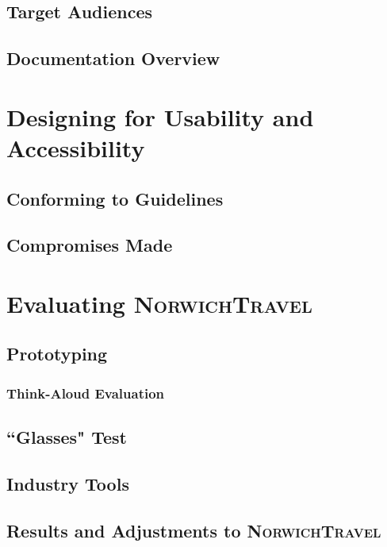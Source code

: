 \documentclass{ueacmpstyle}
\newcommand{\nt}{\textsc{NorwichTravel}}
\begin{document}
		\subsection{Target Audiences}
		
		\subsection{Documentation Overview}
	\section{Designing for Usability and Accessibility}
	
		\subsection{Conforming to Guidelines}
		
		\subsection{Compromises Made}
	\section{Evaluating \nt}
	
		\subsection{Prototyping}
		
			\subsubsection{Think-Aloud Evaluation}
			
		\subsection{``Glasses" Test}
		
		\subsection{Industry Tools}
		
		\subsection{Results and Adjustments to \nt}
			
\end{document}
